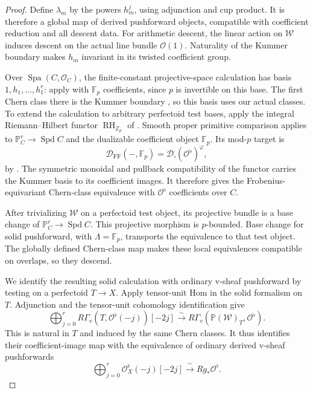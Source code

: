 \documentclass[11pt]{article}
\numberwithin{equation}{section}
\theoremstyle{definition}
\theoremstyle{remark}
\begin{document}
\begin{proof}
Define $\lambda_m$ by the powers $h_m^j$, using adjunction and cup
product.  It is therefore a global map of derived pushforward objects,
compatible with coefficient reduction and all descent data.
For arithmetic descent, the linear action on $\mathcal W$ induces
descent on the actual line bundle $\mathcal O(1)$.  Naturality of the Kummer
boundary makes $h_m$ invariant in its twisted coefficient group.

Over $\operatorname{Spa}(C,\mathcal O_C)$, the finite-constant
projective-space calculation has basis
$1,h_1,\ldots,h_1^r$: apply
\cite[Construction~3.2.1 and Proposition~3.2.2]{LRZ2024}
with $\mathbb F_p$ coefficients, since $p$ is invertible on this base.
The first Chern class there is the Kummer boundary
\cite[Variant~3.1.8]{LRZ2024}, so this basis uses our actual classes.
To extend the calculation to arbitrary perfectoid test bases, apply
the integral Riemann--Hilbert functor
$\operatorname{RH}_{\mathbb Z_p}$ of \cite[Theorem~5.1.7]{ALM2026}.
Smooth proper primitive comparison
\cite[Proposition~5.2.2 and Example~5.2.3]{ALM2026} applies to
$\mathbb P_C^r\to\operatorname{Spd} C$ and the dualizable coefficient object
$\mathbb F_p$. Its mod-$p$ target is
\[
 \mathcal D_{\mathrm{FF}}(-,\mathbb F_p)
   =\mathcal D_{\widehat{\square}}(\mathcal O^\flat)^{\varphi},
\]
by \cite[Remark~5.1.9 and the beginning of \S5.2]{ALM2026}.
The symmetric monoidal and pullback compatibility of the functor
carries the Kummer basis to its coefficient images. It therefore
gives the Frobenius-equivariant Chern-class equivalence with
$\mathcal O^\flat$ coefficients over $C$.

After trivializing $\mathcal W$ on a perfectoid test object, its
projective bundle is a base change of $\mathbb P_C^r\to\operatorname{Spd} C$.
This projective morphism is $p$-bounded. Base change for solid
pushforward, \cite[Proposition~4.2.7(ii)]{ALM2026} with
$\Lambda=\mathbb F_p$, transports the equivalence to that test object.
The globally defined Chern-class map makes these local equivalences
compatible on overlaps, so they descend.

We identify the resulting solid calculation with ordinary v-sheaf
pushforward by testing on a perfectoid $T\to X$. Apply tensor-unit
Hom in the solid formalism on $T$. Adjunction and the tensor-unit
cohomology identification
\cite[Theorem~3.2.1(iii)--(iv)]{BMR2026} give
\[
 \bigoplus_{j=0}^r
    R\Gamma_v(T,\mathcal O^\flat(-j))[-2j]
 \xrightarrow{\ \sim\ }
    R\Gamma_v(\mathbb P(\mathcal W)_T,\mathcal O^\flat).
\]
This is natural in $T$ and induced by the same Chern classes.
It thus identifies their coefficient-image map with the equivalence
of ordinary derived v-sheaf pushforwards
\[
 \bigoplus_{j=0}^r\mathcal O^\flat_X(-j)[-2j]
       \xrightarrow{\ \sim\ } Rg_*\mathcal O^\flat.
\]


\end{proof}
\end{document}
